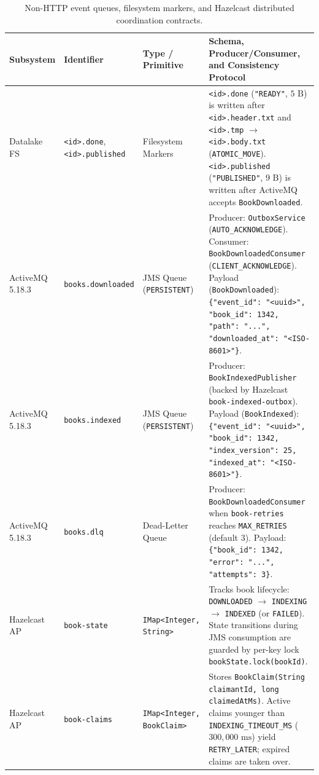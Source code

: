 \documentclass[10pt,a4paper]{article}
\begin{document}
\begin{table}[!htbp]
\centering
\caption{Non-HTTP event queues, filesystem markers, and Hazelcast distributed coordination contracts.}
\label{tab:non_http_contracts}
\scriptsize
\setlength{\tabcolsep}{3.5pt}
\renewcommand{\arraystretch}{1.15}
\begin{tabularx}{\textwidth}{L{2.1cm} L{3.1cm} L{2.8cm} Y}
\toprule
\textbf{Subsystem} & \textbf{Identifier} & \textbf{Type / Primitive} & \textbf{Schema, Producer/Consumer, and Consistency Protocol} \\
\midrule
Datalake FS & \texttt{<id>.done}, \texttt{<id>.published} & Filesystem Markers & \texttt{<id>.done} (\texttt{"READY"}, $5\text{ B}$) is written after \texttt{<id>.header.txt} and \texttt{<id>.tmp} $\to$ \texttt{<id>.body.txt} (\texttt{ATOMIC\_MOVE}). \texttt{<id>.published} (\texttt{"PUBLISHED"}, $9\text{ B}$) is written after ActiveMQ accepts \texttt{BookDownloaded}. \\
ActiveMQ 5.18.3 & \texttt{books.downloaded} & JMS Queue (\texttt{PERSISTENT}) & Producer: \texttt{OutboxService} (\texttt{AUTO\_ACKNOWLEDGE}). Consumer: \texttt{BookDownloadedConsumer} (\texttt{CLIENT\_ACKNOWLEDGE}). Payload (\texttt{BookDownloaded}): \texttt{\{"event\_id": "<uuid>", "book\_id": 1342, "path": "...", "downloaded\_at": "<ISO-8601>"\}}. \\
ActiveMQ 5.18.3 & \texttt{books.indexed} & JMS Queue (\texttt{PERSISTENT}) & Producer: \texttt{BookIndexedPublisher} (backed by Hazelcast \texttt{book-indexed-outbox}). Payload (\texttt{BookIndexed}): \texttt{\{"event\_id": "<uuid>", "book\_id": 1342, "index\_version": 25, "indexed\_at": "<ISO-8601>"\}}. \\
ActiveMQ 5.18.3 & \texttt{books.dlq} & Dead-Letter Queue & Producer: \texttt{BookDownloadedConsumer} when \texttt{book-retries} reaches \texttt{MAX\_RETRIES} (default $3$). Payload: \texttt{\{"book\_id": 1342, "error": "...", "attempts": 3\}}. \\
Hazelcast AP & \texttt{book-state} & \texttt{IMap<Integer, String>} & Tracks book lifecycle: \texttt{DOWNLOADED} $\to$ \texttt{INDEXING} $\to$ \texttt{INDEXED} (or \texttt{FAILED}). State transitions during JMS consumption are guarded by per-key lock \texttt{bookState.lock(bookId)}. \\
Hazelcast AP & \texttt{book-claims} & \texttt{IMap<Integer, BookClaim>} & Stores \texttt{BookClaim(String claimantId, long claimedAtMs)}. Active claims younger than \texttt{INDEXING\_TIMEOUT\_MS} ($300,000\text{ ms}$) yield \texttt{RETRY\_LATER}; expired claims are taken over. \\

\end{tabularx}
\end{table}
\end{document}
